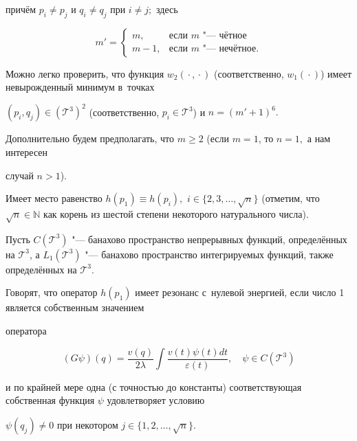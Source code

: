 причём $p_i\neq p_j$ и $q_i\neq q_j$ при $i \neq j;$ здесь

$$

m'=\left \lbrace

\begin{array}{ll}

m, & \mbox{если}\,\, m \,\, \mbox{"--- чётное} \\

m-1, & \mbox{если}\,\, m \,\, \mbox{"--- нечётное} .

\end{array} \right.

$$



Можно легко проверить, что функция $w_2({}\cdot{}, {}\cdot{})$ (соответственно, $w_1({}\cdot{})$\/) имеет невырожденный минимум в~точках

$(p_i, q_j)\in ({\mathcal T}^3)^2$ (соответственно, $p_i\in {\mathcal T}^3$) и $n=(m'+1)^6.$ 

Дополнительно будем предполагать, что $m\geq 2$ (если $m=1$, то $n=1,$ а  нам интересен

случай $n>1$).



\smallskip



\begin{remark}

Имеет место равенство $h(p_{1})\equiv h(p_{i}),$ $i\in\{2, 3, \dots, \sqrt{n} \}$ (отметим, что $\sqrt{n} \in \mathbb N$ как корень из шестой степени некоторого натурального числа).

\end{remark}



\smallskip



Пусть $C({\mathcal T}^3)$ "--- банахово пространство непрерывных функций, определённых на ${\mathcal T}^3$, а $L_1({\mathcal T}^3)$ "--- банахово пространство интегрируемых функций, также определённых на ${\mathcal T}^3$.



\smallskip \hypertarget{ras2:def:1}{}

\begin{definition}[1]

Говорят, что оператор $h(p_1)$ имеет резонанс с~нулевой энергией, если число 1 является собственным значением

оператора

$$

(G\psi)(q)=\frac{v(q)}{2\lambda}\int\frac{v(t)\psi(t)dt}{\varepsilon(t)},\quad

\psi \in C({\mathcal T}^3)

$$

и по крайней мере одна (с точностью до константы) соответствующая \linebreak собственная функция $\psi$ удовлетворяет условию

$\psi(q_j)\neq 0$ при некотором \mbox{$j\in \{1, 2, \dots, \sqrt{n}\}.$}

\end{definition}



